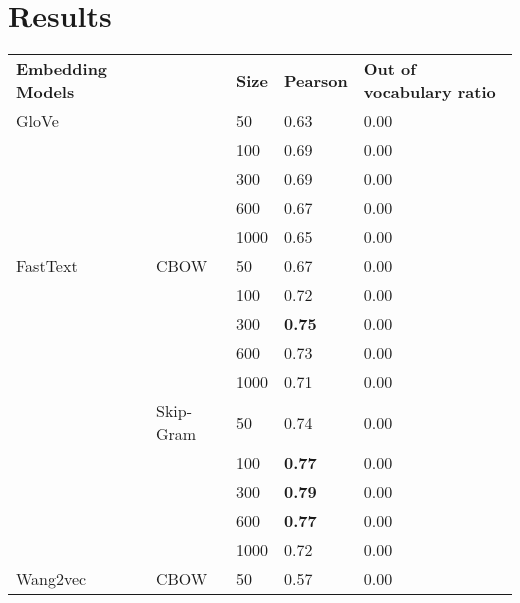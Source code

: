 \section{Results}\label{chap:results}

\begin{table}[]
\centering
\begin{tabular}{@{}lllll@{}}
\cmidrule(r){1-5}
\textbf{Embedding Models} &               & \textbf{Size} & \textbf{Pearson}          & \textbf{Out of vocabulary ratio} \\ \cmidrule(r){1-5}
GloVe            &               & 50   & 0.63             & 0.00                    \\
                 &               & 100  & 0.69             & 0.00                    \\
                 &               & 300  & 0.69             & 0.00                    \\
                 &               & 600  & 0.67             & 0.00                    \\
                 &               & 1000 & 0.65             & 0.00                    \\ \cmidrule(r){1-5}
FastText         & CBOW          & 50   & 0.67             & 0.00                    \\
                 &               & 100  & 0.72             & 0.00                    \\
                 &               & 300  & \textbf{0.75}    & 0.00                    \\
                 &               & 600  & 0.73             & 0.00                    \\
                 &               & 1000 & 0.71             & 0.00                    \\ \cmidrule(lr){2-5}
                 & Skip-Gram     & 50   & 0.74             & 0.00                    \\
                 &               & 100  & \textbf{0.77}    & 0.00                    \\
                 &               & 300  & \textbf{0.79}    & 0.00                    \\
                 &               & 600  & \textbf{0.77}    & 0.00                    \\
                 &               & 1000 & 0.72             & 0.00                    \\ \cmidrule(r){1-5}
Wang2vec         & CBOW          & 50   & 0.57             & 0.00                    \\

\end{tabular}
\end{table}
